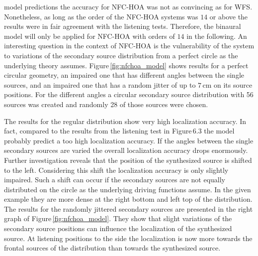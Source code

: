  model predictions the accuracy for \ac{NFC-HOA} was
not as convincing as for \ac{WFS}. Nonetheless, as long as the order of the
\ac{NFC-HOA} systems was $14$ or above the results were in fair agreement with
the listening tests.
Therefore, the binaural model will only be applied for \ac{NFC-HOA} with orders
of $14$ in the following.
An interesting question in the context of \ac{NFC-HOA} is the vulnerability of
the system to variations of the secondary source distribution from a perfect
circle as the underlying theory assumes.
Figure\,\ref{fig:nfchoa_model} shows results for a perfect
circular geometry, an impaired one that has different angles between the single
sources, and an impaired one that has a random jitter of up to $7$\,cm on
its source positions. For the different angles a circular secondary source
distribution with 56 sources was created and randomly 28 of those sources were
chosen.
%
\begin{figure*}
    \centering
    \small
    
    \caption{Model predictions of the perceived direction for a synthesized
    point source in the audience area. All three secondary source distributions
    were driven by \ac{NFC-HOA}~\protect\eqref{eq:D_nfchoa_ps_25D} with an order of
    $14$. For both distributions to the right the positions of the secondary
    sources were changed.
    }
    \label{fig:nfchoa_model}
\end{figure*}
%
The results for the regular distribution show very high
localization accuracy. In fact, compared to the results from the listening test
in Figure\,6.3 the model probably predict a too
high localization accuracy.
If the angles between the single secondary sources are varied the overall localization
accuracy drops enormously. Further investigation reveals that the position of
the synthesized source is shifted to the left. Considering this shift the
localization accuracy is only slightly impaired. Such a shift can occur if the
secondary sources are not equally distributed on the circle as the underlying
driving functions assume. In the given example they are
more dense at the right bottom and left top of the distribution.
The results for the randomly jittered secondary sources are presented in the
right graph of Figure\,\ref{fig:nfchoa_model}. They show that slight variations
of the secondary source positions can influence the localization of
the synthesized source. At listening positions to the side the localization is
now more towards the frontal sources of the distribution than towards the
synthesized source. 


